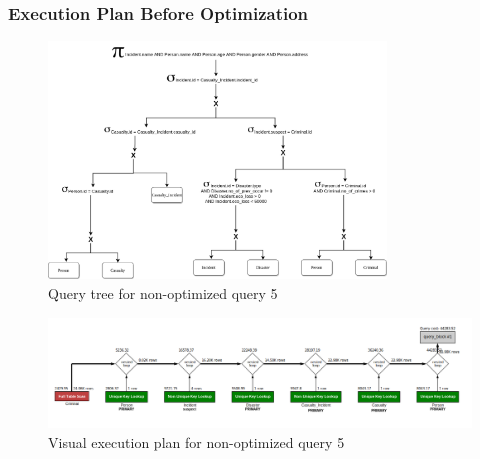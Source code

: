 \subsubsection{Execution Plan Before Optimization}
\begin{figure}[H]
    \centering
    \includegraphics[width=0.8\textwidth]{images/query_trees/query5-non-optimized.png}
    \caption{Query tree for non-optimized query 5}
\end{figure}
\begin{figure}[H]
    \centering
    \includegraphics[width=\textwidth]{images/execution_plans/q5-1-old.png}
    \caption{Visual execution plan for non-optimized query 5}
\end{figure}

